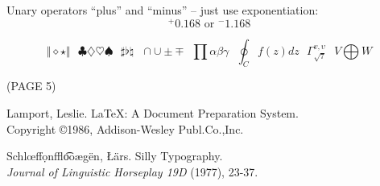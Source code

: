 \documentclass[12pt]{article}
\begin{document}
Unary operators ``plus'' and ``minus'' -- just use exponentiation:
$$	{}^{+}0.168  \mbox{ or } {}^{-}1.168	$$

$$  \Vert \diamond\star \Vert ~~~ \clubsuit\diamondsuit\heartsuit\spadesuit
 ~~~ \sharp\flat\natural ~~~ \cap\cup\pm\mp ~~~ \prod\alpha\beta\gamma
 ~~~ \oint_Cf(z)dz ~~~ \Gamma_{\sqrt7}^{v,\upsilon} ~~~ V\bigoplus W $$

				(PAGE 5)
\begin{thebibliography}{9}	%

 Lamport, Leslie.
\LaTeX : A Document Preparation System.  \\
Copyright \copyright 1986, Addison-Wesley Publ.Co.,Inc.

 Schl\oe ff\d{o}nffl\t{oo}\ae g\"{e}n,
\L\"{a}rs.  Silly Typography.		\\
{\em Journal of Linguistic Horseplay 19D} (1977), 23-37.

\end{thebibliography}
\end{document}
